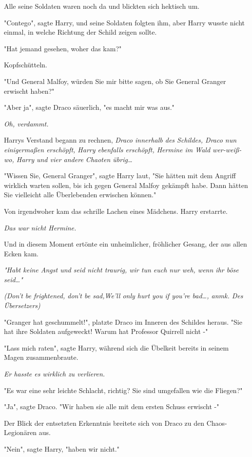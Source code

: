 {Alle seine Soldaten waren noch da und blickten sich hektisch um.

"Contego", sagte Harry, und seine Soldaten folgten ihm, aber Harry wusste nicht einmal, in welche Richtung der Schild zeigen sollte.

"Hat jemand gesehen, woher das kam?"

Kopfschütteln.

"Und General Malfoy, würden Sie mir bitte sagen, ob Sie General Granger erwischt haben?"

"Aber ja", sagte Draco säuerlich, "es macht mir was aus."

\emph{Oh, verdammt.}

Harrys Verstand begann zu rechnen, \emph{Draco innerhalb des Schildes, Draco nun} \emph{einigermaßen erschöpft, Harry ebenfalls erschöpft, Hermine im Wald wer-weiß-wo, Harry und vier andere Chaoten übrig…}

"Wissen Sie, General Granger", sagte Harry laut, "Sie hätten mit dem Angriff wirklich warten sollen, bis ich gegen General Malfoy gekämpft habe. Dann hätten Sie vielleicht alle Überlebenden erwischen können."

Von irgendwoher kam das schrille Lachen eines Mädchens. Harry erstarrte.

\emph{Das war nicht Hermine.}

Und in diesem Moment ertönte ein unheimlicher, fröhlicher Gesang, der aus allen Ecken kam.

\emph{"Habt keine Angst und seid nicht traurig, wir tun euch nur weh, wenn ihr böse seid…"}

\emph{(Don't be frightened, don't be sad,We'll only hurt you if you're bad…, anmk. Des Übersetzers)}

"Granger hat geschummelt!", platzte Draco im Inneren des Schildes heraus. "Sie hat ihre Soldaten aufgeweckt! Warum hat Professor Quirrell nicht -"

"Lass mich raten", sagte Harry, während sich die Übelkeit bereits in seinem Magen zusammenbraute.

\emph{Er hasste es wirklich zu verlieren.}

"Es war eine sehr leichte Schlacht, richtig? Sie sind umgefallen wie die Fliegen?"

"Ja", sagte Draco. "Wir haben sie alle mit dem ersten Schuss erwischt -"

Der Blick der entsetzten Erkenntnis breitete sich von Draco zu den Chaos-Legionären aus.

"Nein", sagte Harry, "haben wir nicht."

}
